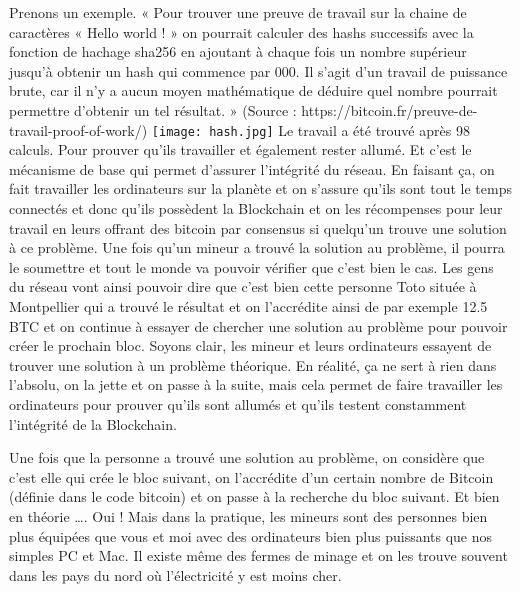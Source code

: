 \documentclass{bredele} %
\begin{document}
    \newline
    Prenons un exemple. « Pour trouver une preuve de travail sur la chaine de caractères « Hello world ! » on pourrait calculer des hashs successifs avec la fonction de hachage sha256 en ajoutant à chaque fois un nombre supérieur jusqu’à obtenir un hash qui commence par 000. Il s’agit d’un travail de puissance brute, car il n’y a aucun moyen mathématique de déduire quel nombre pourrait permettre d’obtenir un tel résultat. » (Source : https://bitcoin.fr/preuve-de-travail-proof-of-work/)
    \newline
    \texttt{[image: hash.jpg]}
    \newline
    Le travail a été trouvé après 98 calculs.
    Pour prouver qu’ils travailler et également rester allumé. Et c’est le mécanisme de base qui permet d’assurer l’intégrité du réseau. En faisant ça, on fait travailler les ordinateurs sur la planète et on s’assure qu’ils sont tout le temps connectés et donc qu’ils possèdent la Blockchain et on les récompenses pour leur travail en leurs offrant des bitcoin par consensus si quelqu’un trouve une solution à ce problème.
    \newline
    Une fois qu’un mineur a trouvé la solution au problème, il pourra le soumettre et tout le monde va pouvoir vérifier que c’est bien le cas. Les gens du réseau vont ainsi pouvoir dire que c’est bien cette personne Toto située à Montpellier qui a trouvé le résultat et on l’accrédite ainsi de par exemple 12.5 BTC et on continue à essayer de chercher une solution au problème pour pouvoir créer le prochain bloc.
    \newline
    \newline
    Soyons clair, les mineur et leurs ordinateurs essayent de trouver une solution à un problème théorique. En réalité, ça ne sert à rien dans l’absolu, on la jette et on passe à la suite, mais cela permet de faire travailler les ordinateurs pour prouver qu’ils sont allumés et qu’ils testent constamment l’intégrité de la Blockchain.

    Une fois que la personne a trouvé une solution au problème, on considère que c’est elle qui crée le bloc suivant, on l’accrédite d’un certain nombre de Bitcoin (définie dans le code bitcoin) et on passe à la recherche du bloc suivant.
    Et bien en théorie …. Oui ! Mais dans la pratique, les mineurs sont des personnes bien plus équipées que vous et moi avec des ordinateurs bien plus puissants que nos simples PC et Mac. Il existe même des fermes de minage et on les trouve souvent dans les pays du nord où l’électricité y est moins cher.
\end{document}

